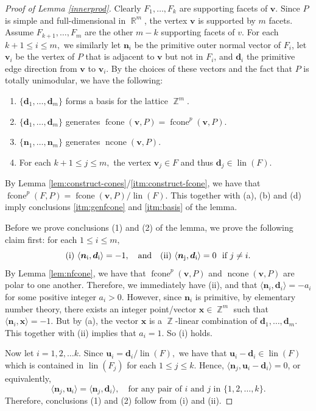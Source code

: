 \documentclass[12pt]{amsart}
\numberwithin{equation}{section}
\theoremstyle{definition}
\def\fcone{\operatorname{fcone}}
\def\ncone{\operatorname{ncone}}
\def\lin{\operatorname{lin}}
\def\bv{{\boldsymbol{v}}}
\def\bd{\boldsymbol{d}}
\def\bx{\boldsymbol{x}}
\def\bn{\boldsymbol{n}}
\def\bu{\boldsymbol{u}}
\def\Z{\operatorname{\mathbb{Z}}}
\def\R{\operatorname{\mathbb{R}}}
\begin{document}
\begin{proof}[Proof of Lemma \ref{innerprod}]
  Clearly $F_1, \dots, F_k$ are supporting facets of $\bv.$ Since $P$ is simple and full-dimensional in $\R^m$, the vertex $\bv$ is supported by $m$ facets. Assume $F_{k+1}, \dots, F_m$ are the other $m-k$ supporting facets of $v.$ For each $k+1 \le i \le m,$ we similarly let $\bn_i$ be the primitive outer normal vector of $F_{i}$, let $\bv_{i}$ be the vertex of $P$ that is adjacent to $\bv$ but not in $F_{i}$, and $\bd_{i}$ the primitive edge direction from $\bv$ to $\bv_{i}$. By the choices of these vectors and the fact that $P$ is totally unimodular, we have the following:
  \begin{enumerate}[label=(\alph*)]
    \item $\{ \bd_1, \dots, \bd_m\}$ forms a basis for the lattice $\Z^m.$ 
    \item $\{\bd_1,\dots, \bd_m\}$ generates $\fcone(\bv,P) = \fcone^p(\bv,P)$.
  \item  $\{\bn_1, \dots, \bn_m\}$ generates $\ncone(\bv,P)$.
  \item For each $k+1 \le j \le m,$ the vertex $\bv_j \in F$ and thus $\bd_j \in \lin(F)$.
\end{enumerate}
By Lemma \ref{lem:construct-cones}/\eqref{itm:construct-fcone}, we have that $\fcone^p(F,P) = \fcone(\bv,P)/\lin(F)$. This together with (a), (b) and (d) imply conclusions \ref{itm:genfcone} and \ref{itm:basis} of the lemma.

Before we prove conclusions (1) and (2) of the lemma, we prove the following claim first: for each $1 \le i \le m,$
\[ (\rm{i}) \ \langle \bn_{i},\bd_{i} \rangle = -1, \quad \text{and} \quad (\rm{ii}) \ \langle \bn_{j},\bd_{i} \rangle = 0~~\text{if $j\neq i$}.\]
By Lemma \ref{lem:nfcone}, we have that $\fcone^p(\bv,P)$ and $\ncone(\bv,P)$ are polar to one another. Therefore, we immediately have (ii), and that $\langle \bn_{i},\bd_{i} \rangle = -a_i$ for some positive integer $a_i >0$. However, since $\bn_i$ is primitive, by elementary number theory, there exists an integer point/vector $\bx \in \Z^{m}$ such that $\langle \bn_{i}, \bx \rangle=-1.$ But by (a), the vector $\bx$ is a $\Z$-linear combination of $\bd_1, \dots, \bd_m.$ This together with (ii) implies that $a_i = 1$. So (i) holds. 

Now let $i = 1, 2, \dots k.$ Since $\bu_i = \bd_i/\lin(F),$ we have that $\bu_i - \bd_i \in \lin(F)$ which is contained in $\lin(F_j)$ for each $1 \le j \le k.$ Hence, $\langle \bn_j, \bu_{i}-\bd_{i} \rangle = 0$, or equivalently, 
\[ \langle \bn_{j}, \bu_{i} \rangle = \langle \bn_{j}, \bd_{i} \rangle, \quad \text{for any pair of $i$ and $j$ in $\{1, 2, \dots, k\}$}.\]
Therefore, conclusions (1) and (2) follow from (i) and (ii).
\end{proof}
\end{document}
